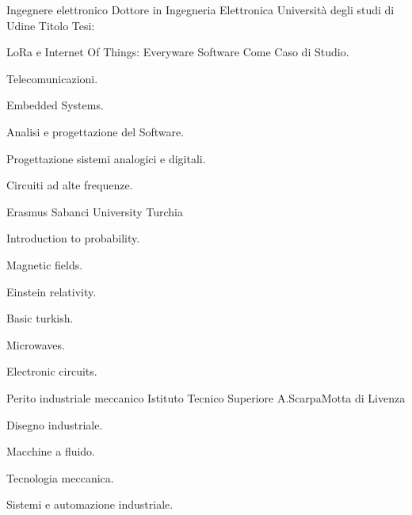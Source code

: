 \documentclass[italian,a4paper]{europasscv}
\begin{document}
	\begin{europasscv}
	\ecvpersonalinfo
	 {Ingegnere elettronico}
	 {
		Dottore in Ingegneria Elettronica
	}
	\ecvitem{} {
		Università degli studi di Udine
	}
	\ecvitem{} {
		\textcolor{ecvhighlightcolor}{Titolo Tesi}:
	}
	\begin{center} {
		LoRa e Internet Of Things:\linebreak
		Everyware Software Come Caso di Studio.
	}
	\end{center}
	\ecvitem{} {
		\begin{ecvitemize}
			\item Telecomunicazioni.
			\item Embedded Systems.
			\item Analisi e progettazione del Software.
			\item Progettazione sistemi analogici e digitali.
			\item Circuiti ad alte frequenze.
		\end{ecvitemize}
	}

	 {
		Erasmus
	}
	\ecvitem{} {
		Sabanci University Turchia
	}
	\ecvitem{} {
		\begin{ecvitemize}
			\item Introduction to probability.
			\item Magnetic fields.
			\item Einstein relativity.
			\item Basic turkish.
			\item Microwaves.
			\item Electronic circuits.
		\end{ecvitemize}
	}

	 {
		Perito industriale meccanico
	}
	\ecvitem{} {
		Istituto Tecnico Superiore A.Scarpa\newline Motta di Livenza
	}
	\ecvitem{} {
		\begin{ecvitemize}
			\item Disegno industriale.
			\item Macchine a fluido.
			\item Tecnologia meccanica.
			\item Sistemi e automazione industriale.
		\end{ecvitemize}
	}



\end{europasscv}
\end{document}
